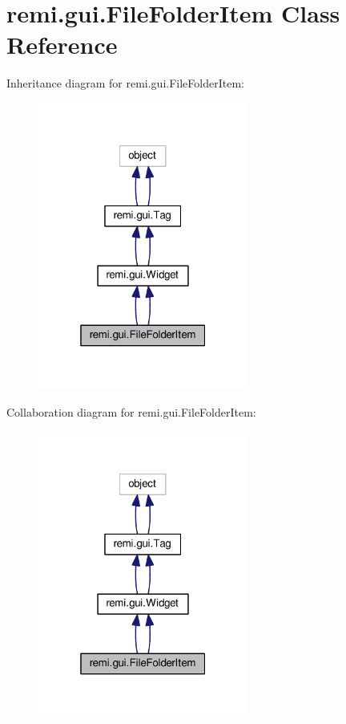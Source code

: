 \hypertarget{classremi_1_1gui_1_1FileFolderItem}{}\section{remi.\+gui.\+File\+Folder\+Item Class Reference}
\label{classremi_1_1gui_1_1FileFolderItem}


Inheritance diagram for remi.\+gui.\+File\+Folder\+Item\+:
\nopagebreak
\begin{figure}[H]
\begin{center}
\leavevmode
\includegraphics[width=196pt]{dd/de7/classremi_1_1gui_1_1FileFolderItem__inherit__graph}
\end{center}
\end{figure}


Collaboration diagram for remi.\+gui.\+File\+Folder\+Item\+:
\nopagebreak
\begin{figure}[H]
\begin{center}
\leavevmode
\includegraphics[width=196pt]{d2/da9/classremi_1_1gui_1_1FileFolderItem__coll__graph}
\end{center}
\end{figure}

